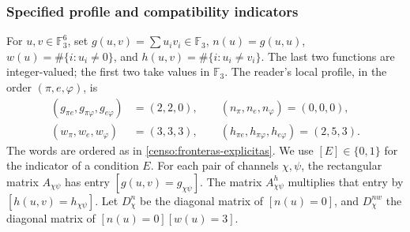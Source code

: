 \subsubsection{Specified profile and compatibility indicators}

For \(u,v\in\mathbb F_3^6\), set
\(g(u,v)=\sum u_iv_i\in\mathbb F_3\),
\(n(u)=g(u,u)\), \(w(u)=\#\{i:u_i\ne0\}\), and
\(h(u,v)=\#\{i:u_i\ne v_i\}\). The last two functions are
integer-valued; the first two take values in \(\mathbb F_3\).
The reader's local profile, in the order \((\pi,e,\varphi)\), is
\begin{equation}
 \begin{split}
 (g_{\pi e},g_{\pi\varphi},g_{e\varphi})&=(2,2,0),\qquad
 (n_\pi,n_e,n_\varphi)=(0,0,0),\\
 (w_\pi,w_e,w_\varphi)&=(3,3,3),\qquad
 (h_{\pi e},h_{\pi\varphi},h_{e\varphi})=(2,5,3).
 \end{split}
 \label{censo:perfil-local}
\end{equation}
The words are ordered as in \eqref{censo:fronteras-explicitas}.
We use \([E]\in\{0,1\}\) for the indicator of a condition \(E\).
For each pair of channels \(\chi,\psi\), the rectangular matrix
\(A_{\chi\psi}\) has entry \([g(u,v)=g_{\chi\psi}]\).
The matrix \(A^{h}_{\chi\psi}\) multiplies that entry by
\([h(u,v)=h_{\chi\psi}]\). Let \(D_\chi^n\) be the diagonal matrix
of \([n(u)=0]\), and \(D_\chi^{nw}\) the diagonal matrix of
\([n(u)=0][w(u)=3]\).

